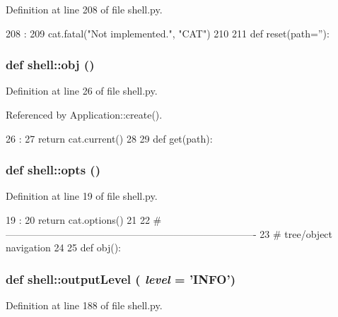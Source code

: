 Definition at line 208 of file shell.py.


\begin{DoxyCode}
208              :
209   cat.fatal("Not implemented.", "CAT")
210 
211 
def reset(path=''):
\end{DoxyCode}
\hypertarget{namespaceshell_aefddda8d474bea36a357e852eaa114cd}{
\subsubsection[{obj}]{\setlength{\rightskip}{0pt plus 5cm}def shell::obj ()}}
\label{namespaceshell_aefddda8d474bea36a357e852eaa114cd}


Definition at line 26 of file shell.py.

Referenced by Application::create().


\begin{DoxyCode}
26          :
27   return cat.current()
28 
29 
def get(path):
\end{DoxyCode}
\hypertarget{namespaceshell_abce87102a3fbbc7ae050316e8b4ac66f}{
\subsubsection[{opts}]{\setlength{\rightskip}{0pt plus 5cm}def shell::opts ()}}
\label{namespaceshell_abce87102a3fbbc7ae050316e8b4ac66f}


Definition at line 19 of file shell.py.


\begin{DoxyCode}
19           :
20   return cat.options()
21 
22 #----------------------------------------------------------------------------
23 # tree/object navigation
24 
25 
def obj():
\end{DoxyCode}
\hypertarget{namespaceshell_ad5ae40bbfdb1f4e1c5778aa23a7db3aa}{
\subsubsection[{outputLevel}]{\setlength{\rightskip}{0pt plus 5cm}def shell::outputLevel ( {\em level} = {\ttfamily 'INFO'})}}
\label{namespaceshell_ad5ae40bbfdb1f4e1c5778aa23a7db3aa}


Definition at line 188 of file shell.py.


